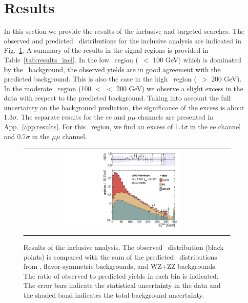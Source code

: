\clearpage

\section{Results}

In this section we provide the results of the inclusive and targeted searches. The observed and predicted \MET\ distributions for the
inclusive analysis are indicated in Fig.~\ref{fig:results_incl}. A summary of the results in the signal regions is provided in
Table~\ref{tab:results_incl}. In the low \MET\ region (\MET\ $<$ 100 GeV) which is dominated by the \zjets\ background, the observed
yields are in good agreement with the predicted background. This is also the case in the high \MET\ region (\MET\ $>$ 200 GeV).
In the moderate \MET\ region (100 $<$ \MET $<$ 200 GeV) we observe a slight excess in the data with respect to the predicted background.
Taking into account the full uncertainty on the background prediction, the significance of the excess is about 1.3$\sigma$. 
The separate results for the ee and $\mu\mu$ channels are presented in App.~\ref{app:results}. For this \MET\ region, we find an excess
of 1.4$\sigma$ in the ee channel and 0.7$\sigma$ in the $\mu\mu$ channel.


\begin{figure}[!h]
\begin{center}
\begin{tabular}{cc}
\includegraphics[width=0.6\textwidth]{plots/met_0.pdf}
\end{tabular}
\caption{Results of the inclusive analysis. The observed \MET\ distribution (black points) is compared with the sum of the predicted \MET\
distributions from \zjets, flavor-symmetric backgrounds, and WZ+ZZ backgrounds. The ratio of observed to predicted yields in each bin is
indicated. The error bars indicate the statistical uncertainty in the data and the shaded band indicates the total background uncertainty.
\label{fig:results_incl}
}
\end{center}
\end{figure}



